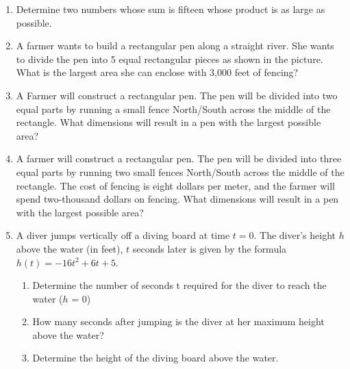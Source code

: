 \begin{enumerate}
\item Determine two numbers whose sum is fifteen whose product is as
  large as possible.
  
\item A farmer wants to build a rectangular pen along a straight
  river.  She wants to divide the pen into 5 equal rectangular pieces
  as shown in the picture.  What is the largest area she can enclose
  with 3,000 feet of fencing?

\begin{center}
\end{center}


\item A Farmer will construct a rectangular pen. The pen will be
  divided into two equal parts by running a small fence North/South
  across the middle of the rectangle. What dimensions will result in a
  pen with the largest possible area?

\item A farmer will construct a rectangular pen.  The pen will be
  divided into three equal parts by running two small fences
  North/South across the middle of the rectangle.  The cost of fencing
  is eight dollars per meter, and the farmer will spend two-thousand
  dollars on fencing. What dimensions will result in a pen with the
  largest possible area?

\item A diver jumps vertically off a diving board at time $t = 0$. The
  diver's height $h$ above the water (in feet), $t$ seconds later is
  given by the formula $h(t) = -16t^2 + 6t + 5$.
\begin{enumerate}
\item Determine the number of seconds t required for the diver to reach the water ($h$ = 0)
\item How many seconds after jumping is the diver at her maximum height above the water?
\item Determine the height of the diving board above the water.
\end{enumerate}


\end{enumerate}
